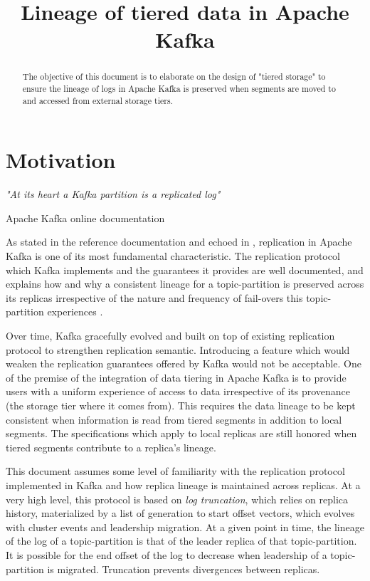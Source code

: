 \documentclass{article}
\title{Lineage of tiered data in Apache Kafka}
\begin{document}
\maketitle \thispagestyle{fancy2}
\begin{abstract}
	The objective of this document is to elaborate on the design of "tiered storage" to ensure the lineage of logs in Apache Kafka is preserved  when segments are moved to and accessed from external storage tiers.
\end{abstract}

\tableofcontents

\newpage
\section{Motivation}
\epigraph{\textit{"At its heart a Kafka partition is a replicated log"}}{Apache Kafka online documentation \cite{RD1}}

As stated in the reference documentation and echoed in \cite{KDG}, replication in Apache Kafka is one of its most fundamental characteristic. The replication protocol which Kafka implements and the guarantees it provides are well documented, and explains how and why a consistent lineage for a topic-partition is preserved across its replicas irrespective of the nature and frequency of fail-overs this topic-partition experiences \cite{KIP101}\cite{KIP279}.

Over time, Kafka gracefully evolved and built on top of existing replication protocol to strengthen replication semantic. Introducing a feature which would weaken the replication guarantees offered by Kafka would not be acceptable. One of the premise of the integration of data tiering in Apache Kafka is to provide users with a uniform experience of access to data irrespective of its provenance (the storage tier where it comes from). This requires the data lineage to be kept consistent when information is read from tiered segments in addition to local segments. The specifications which apply to local replicas are still honored when tiered segments contribute to a replica's lineage.

This document assumes some level of familiarity with the replication protocol implemented in Kafka and how replica lineage is maintained across replicas. At a very high level, this protocol is based on \textit{log truncation}, which relies on replica history, materialized by a list of generation to start offset vectors, which evolves with cluster events and leadership migration. At a given point in time, the lineage of the log of a topic-partition is that of the leader replica of that topic-partition. It is possible for the end offset of the log to decrease when leadership of a topic-partition is migrated. Truncation prevents divergences between replicas.
\end{document}
